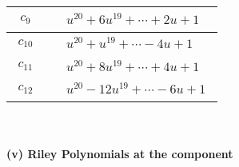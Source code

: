 \documentclass[1p]{elsarticle_modified}
\theoremstyle{definition}
\begin{document}
\begin{tabular}{m{50pt}|m{274pt}}
\hline $$\begin{aligned}c_{9}\end{aligned}$$&$\begin{aligned}
&u^{20}+6 u^{19}+\cdots+2 u+1
\end{aligned}$\\
\hline $$\begin{aligned}c_{10}\end{aligned}$$&$\begin{aligned}
&u^{20}+u^{19}+\cdots-4 u+1
\end{aligned}$\\
\hline $$\begin{aligned}c_{11}\end{aligned}$$&$\begin{aligned}
&u^{20}+8 u^{19}+\cdots+4 u+1
\end{aligned}$\\
\hline $$\begin{aligned}c_{12}\end{aligned}$$&$\begin{aligned}
&u^{20}-12 u^{19}+\cdots-6 u+1
\end{aligned}$\\
\hline
\end{tabular}\\~\\
\newpage\renewcommand{\arraystretch}{1}
\flushleft \textbf{(v) Riley Polynomials at the component}\newline \\
\end{document}
